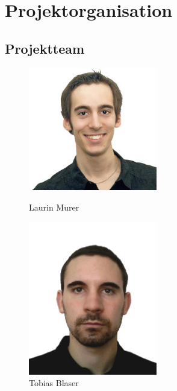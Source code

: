 \chapter{Projektorganisation}

	\section{Projektteam}
	\begin{figure}[H]
		\begin{minipage}[b]{0.5\linewidth}
			\includegraphics[width=0.5\textwidth]{projectPlan/media/img/lmurer.jpg}
			\centering
			\caption{Laurin Murer}
			\label{fig:laurinmurer}
		\end{minipage}
		\begin{minipage}[b]{0.5\linewidth}
			\includegraphics[width=0.5\textwidth]{projectPlan/media/img/tblaser.jpg}
			\centering
			\caption{Tobias Blaser}
			\label{fig:tobiasblaser}
		\end{minipage}
	\end{figure}

